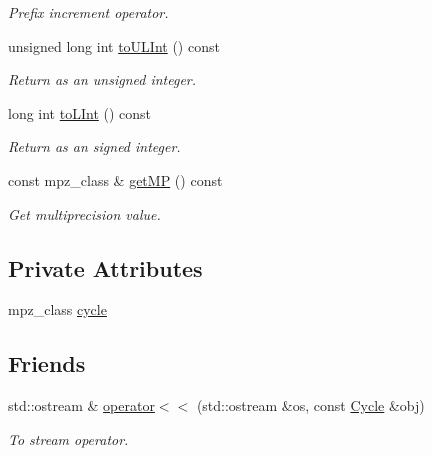 \begin{DoxyCompactItemize}
\begin{DoxyCompactList}\small\item\em \-Prefix increment operator. \end{DoxyCompactList}\item 
unsigned long int \hyperlink{classcryomesh_1_1common_1_1Cycle_a5168b76b3a3f20b5f6e38f96f8f9a8b5}{to\-U\-L\-Int} () const 
\begin{DoxyCompactList}\small\item\em \-Return as an unsigned integer. \end{DoxyCompactList}\item 
long int \hyperlink{classcryomesh_1_1common_1_1Cycle_ad71494a74fe0dfdb7e470a091ee0906d}{to\-L\-Int} () const 
\begin{DoxyCompactList}\small\item\em \-Return as an signed integer. \end{DoxyCompactList}\item 
const mpz\-\_\-class \& \hyperlink{classcryomesh_1_1common_1_1Cycle_ae1d8058a487c48c4a1fe3fbf9f2c4f14}{get\-M\-P} () const 
\begin{DoxyCompactList}\small\item\em \-Get multiprecision value. \end{DoxyCompactList}\end{DoxyCompactItemize}
\subsection*{\-Private \-Attributes}
\begin{DoxyCompactItemize}
\item 
mpz\-\_\-class \hyperlink{classcryomesh_1_1common_1_1Cycle_a42d6c17a2cc0921eee969105ac9c8e03}{cycle}
\end{DoxyCompactItemize}
\subsection*{\-Friends}
\begin{DoxyCompactItemize}
\item 
std\-::ostream \& \hyperlink{classcryomesh_1_1common_1_1Cycle_a19d20624a8c580da1b9ba42ecfa28b3d}{operator$<$$<$} (std\-::ostream \&os, const \hyperlink{classcryomesh_1_1common_1_1Cycle}{\-Cycle} \&obj)
\begin{DoxyCompactList}\small\item\em \-To stream operator. \end{DoxyCompactList}\end{DoxyCompactItemize}


